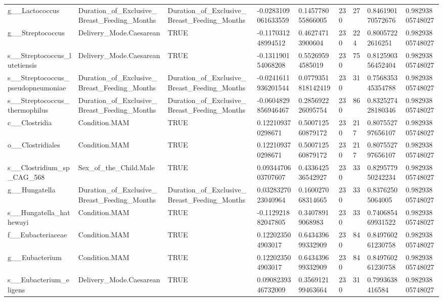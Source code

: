 \begin{longtable}{lllllllll}
g\_\_Lactococcus & Duration\_of\_Exclusive\_Breast\_Feeding\_Months & Duration\_of\_Exclusive\_Breast\_Feeding\_Months & -0.0283109061633559 & 0.145778055866005 & 230 & 27 & 0.846190170572676 & 0.98293805748027 \\
g\_\_Streptococcus & Delivery\_Mode.Caesarean & TRUE & -0.117031248994512 & 0.46274713900604 & 230 & 224 & 0.80057222616251 & 0.98293805748027 \\
s\_\_Streptococcus\_lutetiensis & Delivery\_Mode.Caesarean & TRUE & -0.131190154068208 & 0.55269594585019 & 230 & 75 & 0.812590356452404 & 0.98293805748027 \\
s\_\_Streptococcus\_pseudopneumoniae & Duration\_of\_Exclusive\_Breast\_Feeding\_Months & Duration\_of\_Exclusive\_Breast\_Feeding\_Months & -0.0241611936201544 & 0.0779351818142419 & 230 & 31 & 0.756835345354788 & 0.98293805748027 \\
s\_\_Streptococcus\_thermophilus & Duration\_of\_Exclusive\_Breast\_Feeding\_Months & Duration\_of\_Exclusive\_Breast\_Feeding\_Months & -0.0604829856946467 & 0.285692226095754 & 230 & 86 & 0.832527428180346 & 0.98293805748027 \\
c\_\_Clostridia & Condition.MAM & TRUE & 0.122109370298671 & 0.500712560879172 & 230 & 217 & 0.807552797656107 & 0.98293805748027 \\
o\_\_Clostridiales & Condition.MAM & TRUE & 0.122109370298671 & 0.500712560879172 & 230 & 217 & 0.807552797656107 & 0.98293805748027 \\
s\_\_Clostridium\_sp\_CAG\_568 & Sex\_of\_the\_Child.Male & TRUE & 0.0934470603707607 & 0.433642536542927 & 230 & 33 & 0.829577950242234 & 0.98293805748027 \\
g\_\_Hungatella & Duration\_of\_Exclusive\_Breast\_Feeding\_Months & Duration\_of\_Exclusive\_Breast\_Feeding\_Months & 0.0328327023040964 & 0.160027068314665 & 230 & 33 & 0.83762505064005 & 0.98293805748027 \\
s\_\_Hungatella\_hathewayi & Condition.MAM & TRUE & -0.112921882047805 & 0.34078919068983 & 230 & 33 & 0.740685469931522 & 0.98293805748027 \\
f\_\_Eubacteriaceae & Condition.MAM & TRUE & 0.122023504903017 & 0.643439699332909 & 230 & 84 & 0.849760261230758 & 0.98293805748027 \\
g\_\_Eubacterium & Condition.MAM & TRUE & 0.122023504903017 & 0.643439699332909 & 230 & 84 & 0.849760261230758 & 0.98293805748027 \\
s\_\_Eubacterium\_eligens & Delivery\_Mode.Caesarean & TRUE & 0.0908239346732009 & 0.356912199463664 & 230 & 31 & 0.7993638416584 & 0.98293805748027 \\

\end{longtable}
